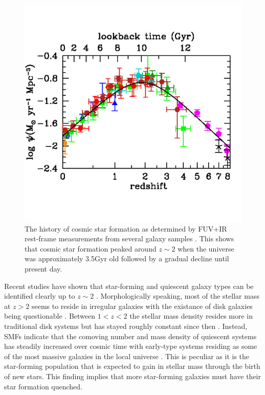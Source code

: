 \begin{figure}
\centering
\includegraphics[width=5in]{Figures/MadauDickinson2014.jpg}
\caption[The history of cosmic star formation.]{The history of cosmic star formation as determined by FUV+IR rest-frame measurements from several galaxy samples \citep[credit:][and references therein]{Madau2014}. This shows that cosmic star formation  peaked around $z\sim2$ when the universe was approximately 3.5Gyr old followed by a gradual decline until present day.}
\label{fig: SFR density}
\end{figure}

Recent studies have shown that star-forming and quiescent galaxy types can be identified clearly up to $z\sim2$ \citep{Brammer2011, Muzzin2013}. Morphologically speaking, most of the stellar mass at $z>2$ seems to reside in irregular galaxies with the existance of disk galaxies being questionable \citep{Dickinson2000,Papovich2005,Cameron2011,Conselice2005,Conselice2011,Buitrago2013}.  Between $1<z<2$ the stellar mass density resides more in traditional disk systems but has stayed roughly constant since then \citep{Bell2004,Brammer2011,Faber2007,Muzzin2013}. Instead, SMFs indicate that the comoving number and mass density of quiescent systems has steadily increased over cosmic time with early-type systems residing as some of the most massive galaxies in the local universe \citep{Brinchmann2000, Bell2003, Bundy2005, Mortlock2013, Kelvin2014, HuertasCompany2016, Thanjavur2016}. This is peculiar as it is the star-forming population that is expected to gain in stellar mass through the birth of new stars. This finding implies that more star-forming galaxies must have their star formation quenched. 

